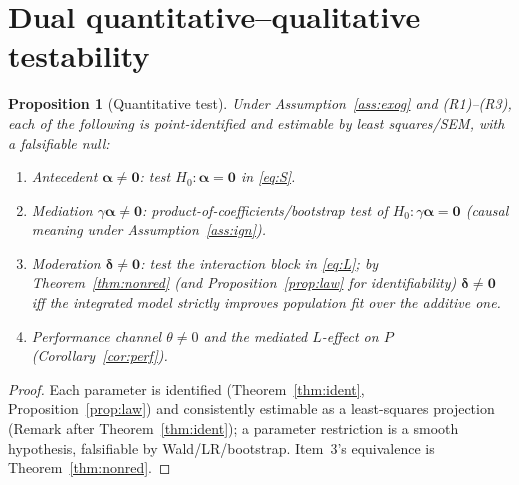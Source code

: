 \documentclass{amsart}
\theoremstyle{definition}
\theoremstyle{plain}
\newtheorem{proposition}{Proposition}
\begin{document}
\section{Dual quantitative--qualitative testability}\label{sec:test}

\begin{proposition}[Quantitative test]\label{prop:quant}
Under Assumption~\ref{ass:exog} and (R1)--(R3), each of the following is point-identified and
estimable by least squares/SEM, with a falsifiable null:
\begin{enumerate}
\item \emph{Antecedent} $\bm\alpha\neq\bm0$: test $H_0:\bm\alpha=\bm0$ in \eqref{eq:S}.
\item \emph{Mediation} $\gamma\bm\alpha\neq\bm0$: product-of-coefficients/bootstrap test of
$H_0:\gamma\bm\alpha=\bm0$ (causal meaning under Assumption~\ref{ass:ign}).
\item \emph{Moderation} $\bm\delta\neq\bm0$: test the interaction block in \eqref{eq:L}; by
Theorem~\ref{thm:nonred} (and Proposition~\ref{prop:law} for identifiability) $\bm\delta\neq
\bm0$ iff the integrated model strictly improves population fit over the additive one.
\item \emph{Performance channel} $\theta\neq0$ and the mediated $L$-effect on $P$
(Corollary~\ref{cor:perf}).
\end{enumerate}
\end{proposition}
\begin{proof}
Each parameter is identified (Theorem~\ref{thm:ident}, Proposition~\ref{prop:law}) and
consistently estimable as a least-squares projection (Remark after Theorem~\ref{thm:ident});
a parameter restriction is a smooth hypothesis, falsifiable by Wald/LR/bootstrap. Item~3's
equivalence is Theorem~\ref{thm:nonred}.
\end{proof}
\end{document}
